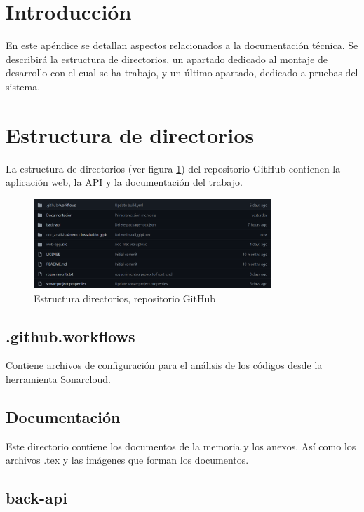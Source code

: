 
\section{Introducción}

En este apéndice se detallan aspectos relacionados a la documentación técnica. Se describirá la estructura de directorios, un apartado dedicado al montaje de desarrollo con el cual se ha trabajo, y un último apartado, dedicado a pruebas del sistema.

\section{Estructura de directorios}

La estructura de directorios (ver figura \ref{fig:estructura_github}) del repositorio GitHub contienen la aplicación web, la API y la documentación del trabajo.

\begin{figure}[h!] 
\centering
    \includegraphics[width=0.8\textwidth]{img/estructura_github.PNG}
\caption{Estructura directorios, repositorio GitHub}
\label{fig:estructura_github}
\end{figure}

\subsection{.github.workflows}

Contiene archivos de configuración para el análisis de los códigos desde la herramienta Sonarcloud.

\subsection{Documentación}

Este directorio contiene los documentos de la memoria y los anexos. Así como los archivos .tex y las imágenes que forman los documentos.

\subsection{back-api}

